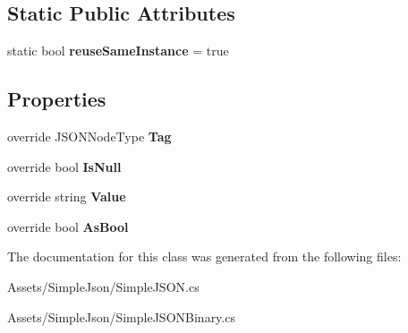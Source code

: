 \subsection*{Static Public Attributes}
\begin{DoxyCompactItemize}
\item 
static bool {\bfseries reuse\+Same\+Instance} = true\hypertarget{classSimpleJSON_1_1JSONNull_a6848d43d9f2673a8b00d8c9f07377410}{}\label{classSimpleJSON_1_1JSONNull_a6848d43d9f2673a8b00d8c9f07377410}

\end{DoxyCompactItemize}
\subsection*{Properties}
\begin{DoxyCompactItemize}
\item 
override J\+S\+O\+N\+Node\+Type {\bfseries Tag}\hypertarget{classSimpleJSON_1_1JSONNull_a2b618f8f7a035bdc6c449634b12b35f8}{}\label{classSimpleJSON_1_1JSONNull_a2b618f8f7a035bdc6c449634b12b35f8}

\item 
override bool {\bfseries Is\+Null}\hypertarget{classSimpleJSON_1_1JSONNull_a4121bf62ec02d9e1a8049befb556403f}{}\label{classSimpleJSON_1_1JSONNull_a4121bf62ec02d9e1a8049befb556403f}

\item 
override string {\bfseries Value}\hypertarget{classSimpleJSON_1_1JSONNull_a3ae9bef4f80a70a8135f32fbf681a0be}{}\label{classSimpleJSON_1_1JSONNull_a3ae9bef4f80a70a8135f32fbf681a0be}

\item 
override bool {\bfseries As\+Bool}\hypertarget{classSimpleJSON_1_1JSONNull_ad2d2c4e4b121a249c8f7557ac3779ca5}{}\label{classSimpleJSON_1_1JSONNull_ad2d2c4e4b121a249c8f7557ac3779ca5}

\end{DoxyCompactItemize}


The documentation for this class was generated from the following files\+:\begin{DoxyCompactItemize}
\item 
Assets/\+Simple\+Json/Simple\+J\+S\+O\+N.\+cs\item 
Assets/\+Simple\+Json/Simple\+J\+S\+O\+N\+Binary.\+cs\end{DoxyCompactItemize}
